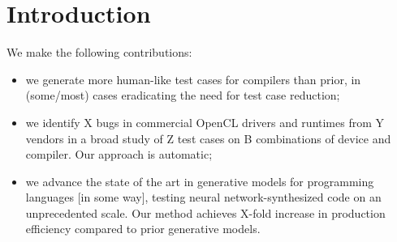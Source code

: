 \section{Introduction}\label{sec:intro}

 We make the following contributions:
%
\begin{itemize}
\item we generate more human-like test cases for compilers than prior, in (some/most) cases eradicating the need for test case reduction;
\item we identify X bugs in commercial OpenCL drivers and runtimes from Y vendors in a broad study of Z test cases on B combinations of device and compiler. Our approach is automatic;
\item we advance the state of the art in generative models for programming languages [in some way], testing neural network-synthesized code on an unprecedented scale. Our method achieves X-fold increase in production efficiency compared to prior generative models.
\end{itemize}
